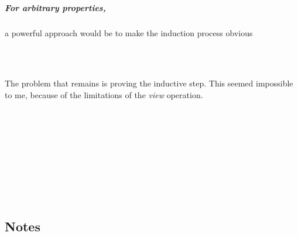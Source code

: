 \documentclass[12pt,twoside,notitlepage]{report}
\begin{document}
\subparagraph{For arbitrary properties,} a powerful approach would be to make the induction process obvious

\begin{code}
\\
\>[0]\<[6]%
\>[6] \AgdaSymbol{:}     \<%
\\
\end{code}

The problem that remains is proving the inductive step. This seemed impossible to me, because of the limitations of the \textit{view} operation.

\begin{code}
\\
\>[0]\<[6]%
\>[6] \AgdaSymbol{:}  \AgdaSymbol{\{} \AgdaSymbol{:} \AgdaSymbol{\}}\<%
\\
\>[6]\<[16]%
\>[16] \AgdaSymbol{(} \AgdaSymbol{:}   \AgdaSymbol{((} \AgdaSymbol{)}  \AgdaSymbol{))}\<%
\\
\>[6]\<[16]%
\>[16] \AgdaSymbol{(} \AgdaSymbol{:}  \AgdaSymbol{)}\<%
\\
\>[6]\<[16]%
\>[16] \AgdaSymbol{(} \AgdaSymbol{:}   \AgdaSymbol{)}\<%
\\
\>[6]\<[16]%
\>[16] \AgdaSymbol{(}     \AgdaSymbol{)}\<%
\\
\>[6]\<[16]%
\>[16] \AgdaSymbol{(} \AgdaSymbol{(} \AgdaSymbol{))}\<%
\\
\>[6]\<[16]%
\>[16] \AgdaSymbol{(} \AgdaSymbol{(} \AgdaSymbol{))}\<%
\\
\end{code}
\subsection{Notes}
\end{document}
